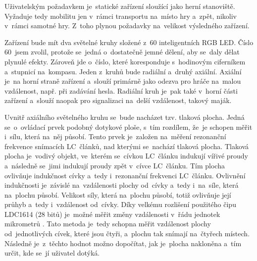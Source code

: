 
Uživatelským požadavkem je~statické zařízení sloužící jako herní stanoviště.
Vyžaduje tedy mobilitu jen v~rámci transportu na~místo hry a~zpět, nikoliv v~rámci samotné hry.
Z~toho plynou požadavky na~velikost výsledného zařízení.

Zařízení bude mít dva světelné kruhy složené z~60 inteligentních RGB LED.
Číslo 60~jsem zvolil, protože se~jedná o~dostatečně jemné dělení, aby se~daly dělat plynulé efekty.
Zároveň jde o~číslo, které koresponduje s~hodinovým ciferníkem a~stupnicí na~kompasu.
Jeden z~kruhů bude radiální a~druhý axiální.
Axiální je~na horní straně zařízení a~slouží primárně jako odezva pro hráče na~malou vzdálenost, např. při zadávání hesla.
Radiální kruh je~pak také v~horní části zařízení a~slouží naopak pro signalizaci na~delší vzdálenost, takový maják.

Uvnitř axiálního světelného kruhu se~bude nacházet tzv. tlaková plocha.
\label{popisTlakovky1} Jedná se~o~ovládací prvek podobný dotykové ploše, s~tím rozdílem, že~je schopen měřit i~sílu, která na~něj působí.
Tento prvek je~založen na~měření rezonanční frekvence snímacích LC~článků, nad kterými se~nachází tlaková plocha.
Tlaková plocha je~vodivý objekt, ve~kterém se~cívkou LC~článku indukují vířivé proudy a~následně se~jimi indukují proudy zpět v~cívce LC~článku.
Tím plocha ovlivňuje indukčnost cívky a~tedy i~rezonanční frekvenci LC~článku.
Ovlivnění indukčnosti je~závislé na~vzdálenosti plochy od~cívky a~tedy i~na~síle, která na~plochu působí.
Velikost síly, která na~plochu působí, totiž ovlivňuje její průhyb a~tedy i~vzdálenost od~cívky.
Díky velkému rozlišení použitého čipu LDC1614 \cite{LDC1614} (28 bitů) je~možné měřit změny vzdálenosti v~řádu jednotek mikrometrů \cite{LDC1614LinearPositionSensing}.
Tato metoda je~tedy schopna měřit vzdálenost plochy od~jednotlivých cívek, které jsou čtyři, a~plochu tak snímají na~čtyřech místech.
Následně je~z~těchto hodnot možno dopočítat, jak je~plocha nakloněna a~tím určit, kde se~jí uživatel dotýká.

